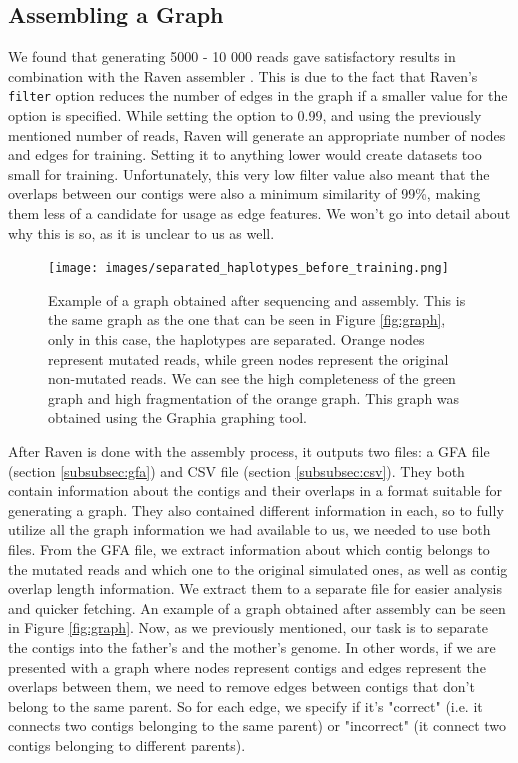 \documentclass[times, utf8, diplomski, english]{fer_eng}
\begin{document}
\subsection{Assembling a Graph}
\label{subsec:assembling the graph}

We found that generating 5000 - 10 000 reads gave satisfactory results in combination with the Raven assembler \cite{Vaser}. This is due to the fact that Raven's \texttt{filter} option reduces the number of edges in the graph if a smaller value for the option is specified. While setting the option to 0.99, and using the previously mentioned number of reads, Raven will generate an appropriate number of nodes and edges for training. Setting it to anything lower would create datasets too small for training. Unfortunately, this very low filter value also meant that the overlaps between our contigs were also a minimum similarity of 99\%, making them less of a candidate for usage as edge features. We won't go into detail about why this is so, as it is unclear to us as well.

\begin{figure}[h]
	\centering
	\texttt{[image: images/separated\_haplotypes\_before\_training.png]}
	\caption[Separated graph]{Example of a graph obtained after sequencing and assembly. This is the same graph as the one that can be seen in Figure \ref{fig:graph}, only in this case, the haplotypes are separated. Orange nodes represent mutated reads, while green nodes represent the original non-mutated reads. We can see the high completeness of the green graph and high fragmentation of the orange graph. This graph was obtained using the Graphia\footnotemark{} graphing tool.}
	\label{fig:separated graph}
\end{figure}

After Raven is done with the assembly process, it outputs two files: a GFA file (section \ref{subsubsec:gfa}) and CSV file (section \ref{subsubsec:csv}). They both contain information about the contigs and their overlaps in a format suitable for generating a graph. They also contained different information in each, so to fully utilize all the graph information we had available to us, we needed to use both files. From the GFA file, we extract information about which contig belongs to the mutated reads and which one to the original simulated ones, as well as contig overlap length information. We extract them to a separate file for easier analysis and quicker fetching. An example of a graph obtained after assembly can be seen in Figure \ref{fig:graph}. Now, as we previously mentioned, our task is to separate the contigs into the father's and the mother's genome. In other words, if we are presented with a graph where nodes represent contigs and edges represent the overlaps between them, we need to remove edges between contigs that don't belong to the same parent. So for each edge, we specify if it's "correct" (i.e. it connects two contigs belonging to the same parent) or "incorrect" (it connect two contigs belonging to different parents).
\end{document}
